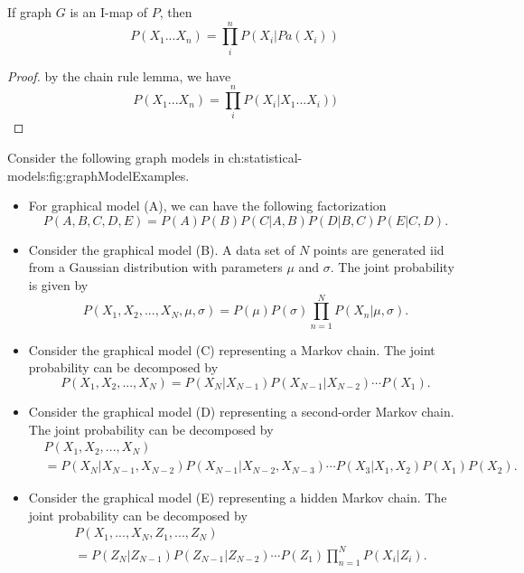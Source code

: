 \begin{refsection}
\begin{theorem}
	If graph $G$ is an I-map of $P$, then
	$$P(X_1...X_n) = \prod_{i}^n P(X_i|Pa(X_i))$$
\end{theorem}
\begin{proof}
	by the chain rule lemma, we have
	$$P(X_1...X_n) = \prod_{i}^n P(X_i|X_1...X_i))$$
\end{proof}


\begin{example}	Consider the following graph models in ch:statistical-models:fig:graphModelExamples.
\begin{itemize}
	\item  For graphical model (A), we can have the following factorization
	$$P(A,B,C,D,E) = P(A)P(B)P(C|A,B)P(D|B,C)P(E|C,D).$$
	\item Consider the graphical model (B). A data set of $N$ points are generated iid from a Gaussian distribution with parameters $\mu$ and $\sigma$. The joint probability is given by
	$$P(X_1,X_2,...,X_N, \mu,\sigma) = P(\mu)P(\sigma) \prod_{n=1}^{N}P(X_n|\mu,\sigma).$$
	\item Consider the graphical model (C) representing a Markov chain.  The joint probability can be decomposed by
		$$P(X_1,X_2,...,X_N) = P(X_N|X_{N-1})P(X_{N-1}|X_{N-2})\cdots P(X_1).$$
	\item Consider the graphical model (D) representing a second-order Markov chain.  The joint probability can be decomposed by
	\begin{align*}
	&P(X_1,X_2,...,X_N) \\
	&= P(X_N|X_{N-1},X_{N-2})P(X_{N-1}|X_{N-2},X_{N-3})\cdots P(X_3|X_1,X_2)P(X_1)P(X_2).
	\end{align*}
	\item Consider the graphical model (E) representing a hidden Markov chain.  The joint probability can be decomposed by
	\begin{align*}
	&P(X_1,...,X_N,Z_1,...,Z_N) \\
	&= P(Z_{N}|Z_{N-1})P(Z_{N-1}|Z_{N-2})\cdots P(Z_1) \prod_{n=1}^N P(X_i|Z_i).
	\end{align*}
\end{itemize}	
\end{example}




\end{refsection}
